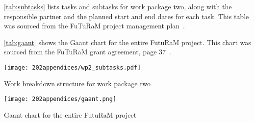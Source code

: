 \label{appendix:tasks}

\autoref{tab:subtasks} lists tasks and subtasks for work package two, along with the responsible partner and the planned start and end dates for each task. This table was sourced from the FuTuRaM project management plan~\cite{futuram2022pmp}.

\autoref{tab:gaant} shows the Gaant chart for the entire FutuRaM project. This chart was sourced from the FuTuRaM grant agreement, page 37~\cite{futuram2022ga}.

\begin{landscape}
  \begin{table}[h!]
    \centering
    \texttt{[image: 202appendices/wp2\_subtasks.pdf]}
    \caption{Work breakdown structure for work package two}\label{tab:subtasks}
  \end{table}
\end{landscape}


\begin{table}[h!]
  \centering
  \texttt{[image: 202appendices/gaant.png]}
  \caption{Gaant chart for the entire FutuRaM project}\label{tab:gaant}
\end{table}
